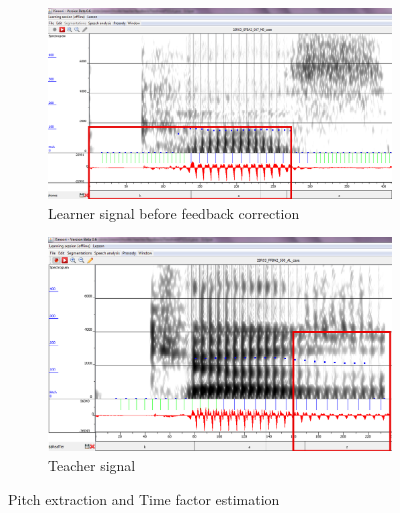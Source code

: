 \documentclass[11pt]{beamer}
\begin{document}
\begin{frame}

\begin{figure}
\begin{subfigure}{.5\textwidth}
  \centering
  \includegraphics[width=0.9\linewidth]{images/case_learner-pitchMarkers.PNG}
  \caption{Learner signal before feedback correction}
  \label{fig:sfig1}
\end{subfigure}%
\begin{subfigure}{.5\textwidth}
  \centering
  \includegraphics[width=0.9\linewidth]{images/teacher_case_Fricative.PNG}
  \caption{Teacher signal}
  \label{fig:sfig2}
\end{subfigure}
\caption{Pitch extraction and Time factor estimation}
\label{fig:fig}
\end{figure}
\end{frame}
\end{document}
